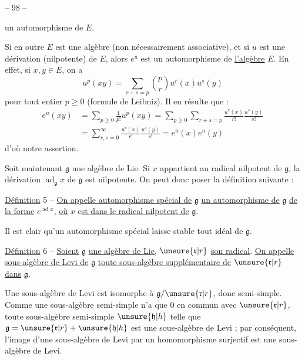 
\begin{center}-- 98 --\end{center}

un automorphisme de $E$.

Si en outre $E$ est une algèbre (non nécessairement associative), et si $u$ est une dérivation (nilpotente) de $E$, alors $e^u$ est un automorphisme de \uline{l'algèbre} $E$. En effet, si $x,y\in E$, on a
\[
u^p(xy)=\sum_{r+s=p}\binom{p}{r}u^r(x)u^s(y)
\]
pour tout entier $p\geqslant0$ (formule de Leibniz). Il en résulte que :
\[
\begin{aligned}
e^u(xy)&=\sum_{p\geqslant0}\frac{1}{p!}u^p(xy)=\sum_{p\geqslant0}\sum_{r+s=p}\frac{u^r(x)}{r!}\frac{u^s(y)}{s!}\\
&=\sum_{r,s=0}^\infty\frac{u^r(x)}{r!}\frac{u^s(y)}{s!}=e^u(x)e^u(y)
\end{aligned}
\]
d'où notre assertion.

Soit maintenant $\mathfrak g$ une algèbre de Lie. Si $x$ appartient au radical nilpotent de $\mathfrak g$, la dérivation $\operatorname{ad}_{\mathfrak g}x$ de $\mathfrak g$ est nilpotente. On peut donc poser la définition suivante :

\uline{Définition} 5 -- \uline{On appelle automorphisme spécial de} $\mathfrak g$ \uline{un automorphisme de} $\mathfrak g$ \uline{de la forme} $e^{\operatorname{ad}x}$, \uline{où} $x$ e\uline{st dans le radical nilpotent de} $\mathfrak g$.

Il est clair qu'un automorphisme spécial laisse stable tout idéal de $\mathfrak g$.

\uline{Définition} 6 -- \uline{Soient} $\mathfrak g$ \uline{une algèbre de Lie}, $\unsure{\mathfrak r|r}$ \uline{son radical}. \uline{On appelle sous-algèbre de Levi de} $\mathfrak g$ \uline{toute sous-algèbre supplémentaire de} $\unsure{\mathfrak r|r}$ \uline{dans} $\mathfrak g$.

Une sous-algèbre de Levi est isomorphe à $\mathfrak g/\unsure{\mathfrak r|r}$, donc semi-simple. Comme une sous-algèbre semi-simple n'a que $0$ en commun avec $\unsure{\mathfrak r|r}$, toute sous-algèbre semi-simple $\unsure{\mathfrak h|h}$ telle que $\mathfrak g=\unsure{\mathfrak r|r}+\unsure{\mathfrak h|h}$ est une sous-algèbre de Levi ; par conséquent, l'image d'une sous-algèbre de Levi par un homomorphisme surjectif est une sous-algèbre de Levi.


